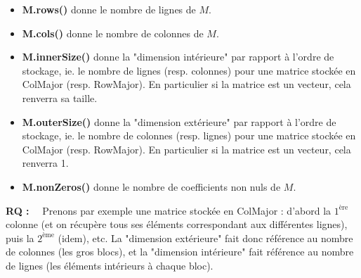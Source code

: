 \documentclass[11pt]{article}
\begin{document}
\begin{itemize}

	\item \textbf{M.rows()} donne le nombre de lignes de $M$.
		
\vspace{1 mm}	
	
	\item \textbf{M.cols()} donne le nombre de colonnes de $M$.
	
\vspace{1 mm}
	
	\item \textbf{M.innerSize()} donne la "dimension intérieure" par rapport à l'ordre de stockage, ie. le nombre de lignes (resp. colonnes) pour une matrice stockée en ColMajor (resp. RowMajor). En particulier si la matrice est un vecteur, cela renverra sa taille.
	
\vspace{1 mm}
	
	\item \textbf{M.outerSize()} donne la "dimension extérieure" par rapport à l'ordre de stockage, ie. le nombre de colonnes (resp. lignes) pour une matrice stockée en ColMajor (resp. RowMajor). En particulier si la matrice est un vecteur, cela renverra 1.
	
\vspace{1 mm}
	
	\item \textbf{M.nonZeros()} donne le nombre de coefficients non nuls de $M$.
	
\end{itemize}

\vspace{5 mm}

\noindent
\textbf{RQ :}~~ Prenons par exemple une matrice stockée en ColMajor : d'abord la $1^\text{ère}$ colonne (et on récupère tous ses éléments correspondant aux différentes lignes), puis la $2^\text{ème}$ (idem), etc. La "dimension extérieure" fait donc référence au nombre de colonnes (les gros blocs), et la "dimension intérieure" fait référence au nombre de lignes (les éléments intérieurs à chaque bloc).

\vspace{5 mm}
\end{document}

